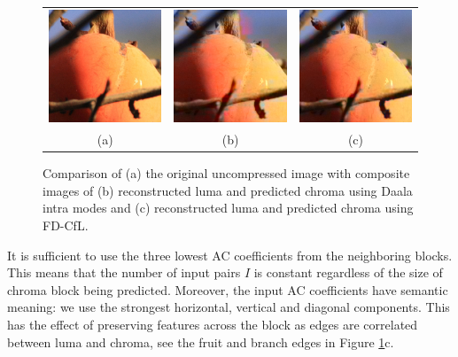 \documentclass[a4paper]{spie}  %
\begin{document}
\begin{figure}
\begin{center}
\begin{tabular}{c c c}
\includegraphics[natwidth=200,natheight=200,width=1.75in]{fruits-orig.png}
&
\includegraphics[natwidth=200,natheight=200,width=1.75in]{fruits-intra.png}
&
\includegraphics[natwidth=200,natheight=200,width=1.75in]{fruits-cfl.png}
\\
(a) & (b) & (c)
\end{tabular}
\end{center}
\caption[example]{\label{fig:comp} Comparison of (a) the original uncompressed
 image with composite images of (b) reconstructed luma and predicted chroma
 using Daala intra modes and (c) reconstructed luma and predicted chroma using
 FD-CfL.}
\end{figure}

It is sufficient to use the three lowest AC coefficients from the neighboring
 blocks.
This means that the number of input pairs $I$ is constant regardless of the
 size of chroma block being predicted.
Moreover, the input AC coefficients have semantic meaning: we use the
 strongest horizontal, vertical and diagonal components.
This has the effect of preserving features across the block as edges are
 correlated between luma and chroma, see the fruit and branch edges in
 Figure \ref{fig:comp}c.
\end{document}
